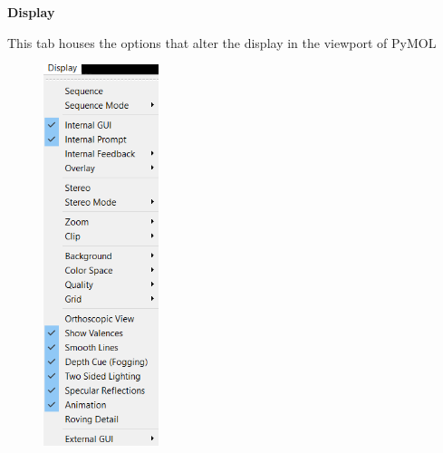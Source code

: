 \documentclass{article}
\begin{document}
\begin{center}
    \Large \textbf{Display}
\end{center}

This tab houses the options that alter the display in the viewport of PyMOL \\

\begin{figure}[h!]
    \centering
    \includegraphics[width=0.3\textwidth]{workshops/pymol/imgs/displaytab.png}
    \caption[]{}
    \label{displaytab}
\end{figure}
\end{document}
